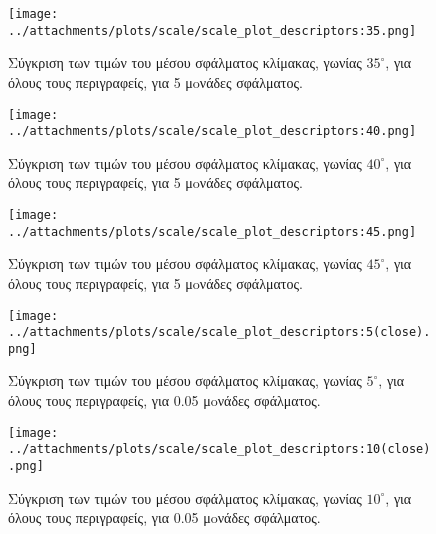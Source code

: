  \newpage
 
 
 \begin{figure}[ht!]
\begin{minipage}[b]{1.0\linewidth}
\centering
\texttt{[image: ../attachments/plots/scale/scale\_plot\_descriptors:35.png]}
\caption{Σύγκριση των τιμών του μέσου σφάλματος κλίμακας, γωνίας $35^{\circ}$, για όλους τους περιγραφείς, για 5 μoνάδες σφάλματος.}
\label{fig:plot_angle_des_35_high}
\end{minipage}
\end{figure} 
\begin{figure}[ht!] 
\begin{minipage}[b]{1.0\linewidth}
\centering
\texttt{[image: ../attachments/plots/scale/scale\_plot\_descriptors:40.png]}
\caption{Σύγκριση των τιμών του μέσου σφάλματος κλίμακας, γωνίας $40^{\circ}$, για όλους τους περιγραφείς, για 5 μoνάδες σφάλματος.}
\label{fig:plot_angle_des_40_high}
\end{minipage}

 \end{figure} 
 
 \newpage
 
\begin{figure}[ht!]
\begin{minipage}[b]{1.0\linewidth}
\centering
\texttt{[image: ../attachments/plots/scale/scale\_plot\_descriptors:45.png]}
\caption{Σύγκριση των τιμών του μέσου σφάλματος κλίμακας, γωνίας $45^{\circ}$, για όλους τους περιγραφείς, για 5 μoνάδες σφάλματος.}
\label{fig:plot_angle_des_45_high}
\end{minipage}
\end{figure} 
 
  \newpage
 
 
 
 
  \begin{figure}[ht!]
\begin{minipage}[b]{1.0\linewidth}
\centering
\texttt{[image: ../attachments/plots/scale/scale\_plot\_descriptors:5(close).png]}
\caption{Σύγκριση των τιμών του μέσου σφάλματος κλίμακας, γωνίας $5^{\circ}$, για όλους τους περιγραφείς, για 0.05 μoνάδες σφάλματος.}
\label{fig:plot_angle_des_5_low}
\end{minipage}
\end{figure} 
\begin{figure}[ht!]
\begin{minipage}[b]{1.0\linewidth}
\centering
\texttt{[image: ../attachments/plots/scale/scale\_plot\_descriptors:10(close).png]}
\caption{Σύγκριση των τιμών του μέσου σφάλματος κλίμακας, γωνίας $10^{\circ}$, για όλους τους περιγραφείς, για 0.05 μoνάδες σφάλματος.}
\label{fig:plot_angle_des_10_low}
\end{minipage}

 \end{figure} 
 
